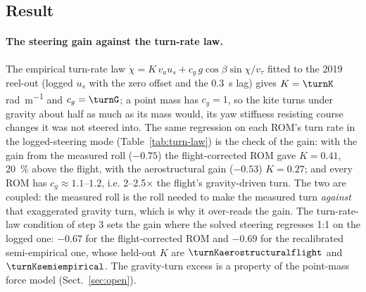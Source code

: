\documentclass[11pt,a4paper]{article}
\begin{document}


\subsection{Result}
\label{sec:fc-result}
\paragraph{The steering gain against the turn-rate law.} The empirical
turn-rate law $\dot\chi = K\,v_a u_s + c_g\,g\cos\beta\sin\chi/v_\tau$
fitted to the 2019 reel-out (logged $u_s$ with the zero offset and the
\SI{0.3}{\second} lag) gives $K=\turnK$\,\si{\radian\per\metre} and
$c_g=\turnG$; a point mass has $c_g=1$, so the kite turns under gravity
about half as much as its mass would, its yaw stiffness resisting course
changes it was not steered into. The same regression on each ROM's turn rate
in the logged-steering mode (Table~\ref{tab:turn-law}) is the check of the
gain: with the gain from the measured roll ($-0.75$) the flight-corrected ROM
gave $K=0.41$, \SI{20}{\percent} above the flight, with the aerostructural
gain ($-0.53$) $K=0.27$; and every ROM has $c_g\approx1.1$--$1.2$, i.e.
2--2.5$\times$ the flight's gravity-driven turn. The two are coupled: the
measured roll is the roll needed to make the measured turn \emph{against}
that exaggerated gravity turn, which is why it over-reads the gain. The
turn-rate-law condition of step 3 sets the gain where the solved steering
regresses 1:1 on the logged one: $-0.67$ for the flight-corrected ROM and
$-0.69$ for the recalibrated semi-empirical one, whose held-out $K$ are
$\turnKaerostructuralflight$ and $\turnKsemiempirical$. The gravity-turn
excess is a property of the point-mass force model (Sect.~\ref{sec:open}).
\end{document}

